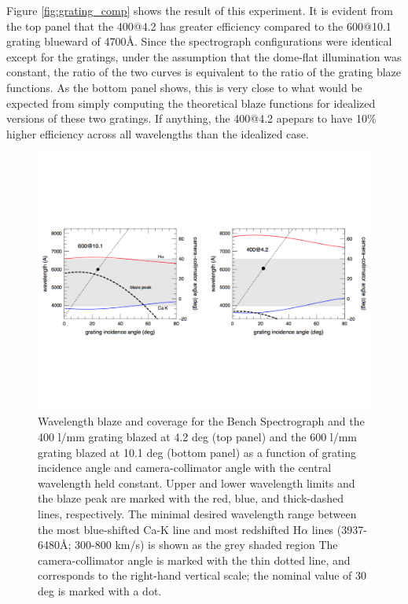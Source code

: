 Figure \ref{fig:grating_comp} shows the result of this experiment. It
is evident from the top panel that the 400@4.2 has greater efficiency
compared to the 600@10.1 grating blueward of 4700\AA. Since the
spectrograph configurations were identical except for the gratings,
under the assumption that the dome-flat illumination was constant, the
ratio of the two curves is equivalent to the ratio of the grating
blaze functions. As the bottom panel shows, this is very close to what
would be expected from simply computing the theoretical blaze
functions for idealized versions of these two gratings. If anything,
the 400@4.2 apepars to have 10\% higher efficiency across all
wavelengths than the idealized case.

\begin{figure}[htb]
  \centering
\vskip -1.25in
  \includegraphics[width=\textwidth]{Appendix/figs/blaze_plot_land.pdf}
\vskip -1.25in
\caption[Comparison of coverage and blaze for 400 and 600 l/mm
gratings]{\label{fig:spec_config}\fixspacing Wavelength blaze and
  coverage for the Bench Spectrograph and the 400 l/mm grating blazed
  at 4.2 deg (top panel) and the 600 l/mm grating blazed at 10.1 deg
  (bottom panel) as a function of grating incidence angle and
  camera-collimator angle with the central wavelength held
  constant. Upper and lower wavelength limits and the blaze peak are
  marked with the red, blue, and thick-dashed lines, respectively. The
  minimal desired wavelength range between the most blue-shifted Ca-K
  line and most redshifted H$\alpha$ lines (3937-6480\AA; 300-800
  km/s) is shown as the grey shaded region The camera-collimator angle
  is marked with the thin dotted line, and corresponds to the
  right-hand vertical scale; the nominal value of 30 deg is marked
  with a dot.}
\end{figure}

